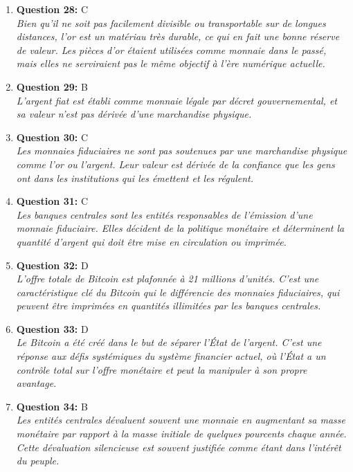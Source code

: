 \documentclass[12pt,a4paper]{article}
\begin{document}
\begin{enumerate}
\item \textbf{Question 28:} C
\\ \textit{Bien qu'il ne soit pas facilement divisible ou transportable sur de longues distances, l'or est un matériau très durable, ce qui en fait une bonne réserve de valeur. Les pièces d'or étaient utilisées comme monnaie dans le passé, mais elles ne serviraient pas le même objectif à l'ère numérique actuelle.}

\item \textbf{Question 29:} B
\\ \textit{L'argent fiat est établi comme monnaie légale par décret gouvernemental, et sa valeur n'est pas dérivée d'une marchandise physique.}

\item \textbf{Question 30:} C
\\ \textit{Les monnaies fiduciaires ne sont pas soutenues par une marchandise physique comme l'or ou l'argent. Leur valeur est dérivée de la confiance que les gens ont dans les institutions qui les émettent et les régulent.}

\item \textbf{Question 31:} C
\\ \textit{Les banques centrales sont les entités responsables de l'émission d'une monnaie fiduciaire. Elles décident de la politique monétaire et déterminent la quantité d'argent qui doit être mise en circulation ou imprimée.}

\item \textbf{Question 32:} D
\\ \textit{L'offre totale de Bitcoin est plafonnée à 21 millions d'unités. C'est une caractéristique clé du Bitcoin qui le différencie des monnaies fiduciaires, qui peuvent être imprimées en quantités illimitées par les banques centrales.}

\item \textbf{Question 33:} D
\\ \textit{Le Bitcoin a été créé dans le but de séparer l'État de l'argent. C'est une réponse aux défis systémiques du système financier actuel, où l'État a un contrôle total sur l'offre monétaire et peut la manipuler à son propre avantage.}

\item \textbf{Question 34:} B
\\ \textit{Les entités centrales dévaluent souvent une monnaie en augmentant sa masse monétaire par rapport à la masse initiale de quelques pourcents chaque année. Cette dévaluation silencieuse est souvent justifiée comme étant dans l'intérêt du peuple.}


\end{enumerate}
\end{document}
